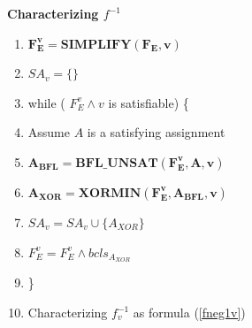 \documentclass[journal]{IEEEtran}
\begin{document}
\vspace{0.2cm}

\begin{algo}\label{buildfdec_frm}
\textbf{Characterizing $f^{-1}$}
\begin{enumerate}%
\item \hspace{0.3cm} $\boldsymbol{F_E^v= SIMPLIFY(F_E,v)}$
\item \hspace{0.3cm} $SA_v= \{\}$
\item \hspace{0.3cm} while ( $F_E^v\wedge v$ is satisfiable) \{
\item \hspace{0.6cm} Assume $A$ is a satisfying assignment
\item \hspace{0.6cm} $\boldsymbol{A_{BFL}= BFL\_UNSAT(F_E^v,A,v)}$
\item \hspace{0.6cm} $\boldsymbol{A_{XOR}= XORMIN(F_E^v, A_{BFL},v)}$
\item \hspace{0.6cm} $SA_v= SA_v \cup \{ A_{XOR} \}$
\item \hspace{0.6cm} $F_E^v= F_E^v\wedge bcls_{A_{XOR}}$
\item \hspace{0.3cm} \}
\item \hspace{0.3cm} Characterizing $f^{-1}_v$ as formula (\ref{fneg1v})
\end{enumerate}
\end{algo}
\end{document}
